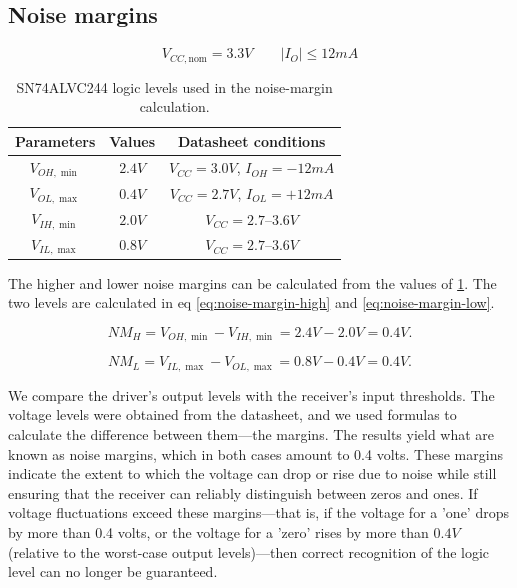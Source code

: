 \subsection{Noise margins} \label{subsec:noise-margins}

\[ V_{CC,\mathrm{nom}}=3.3V \qquad |I_O| \leq 12mA \]

\begin{table}[h]
    \centering
    \begin{tabular}{ccc}
         \hline
         Parameters & Values & Datasheet conditions\\
         \hline
         $V_{OH,\min}$ & $2.4V$ & $V_{CC}=3.0V$, $I_{OH}=-12mA$ \\
         $V_{OL,\max}$ & $0.4V$ & $V_{CC}=2.7V$, $I_{OL}=+12mA$ \\
         $V_{IH,\min}$ & $2.0V$ & $V_{CC}=2.7$--$3.6V$ \\
         $V_{IL,\max}$ & $0.8V$ & $V_{CC}=2.7$--$3.6V$ \\
         \hline
    \end{tabular}
    \caption{SN74ALVC244 logic levels used in the noise-margin calculation.}
    \label{tab:logic-levels}
\end{table}

The higher and lower noise margins can be calculated from the values of \ref{tab:logic-levels}. The two levels are calculated in eq \ref{eq:noise-margin-high} and \ref{eq:noise-margin-low}.

\begin{equation}
NM_H=V_{OH,\min}-V_{IH,\min}=2.4V-2.0V=0.4V.
\label{eq:noise-margin-high}
\end{equation}

\begin{equation}
NM_L=V_{IL,\max}-V_{OL,\max}=0.8V-0.4V=0.4V.
\label{eq:noise-margin-low}
\end{equation}

We compare the driver's output levels with the receiver's input thresholds. The voltage levels were obtained from the datasheet, and we used formulas to calculate the difference between them—the margins. The results yield what are known as noise margins, which in both cases amount to 0.4 volts. These margins indicate the extent to which the voltage can drop or rise due to noise while still ensuring that the receiver can reliably distinguish between zeros and ones. If voltage fluctuations exceed these margins—that is, if the voltage for a 'one' drops by more than 0.4 volts, or the voltage for a 'zero' rises by more than $0.4V$ (relative to the worst-case output levels)—then correct recognition of the logic level can no longer be guaranteed.



